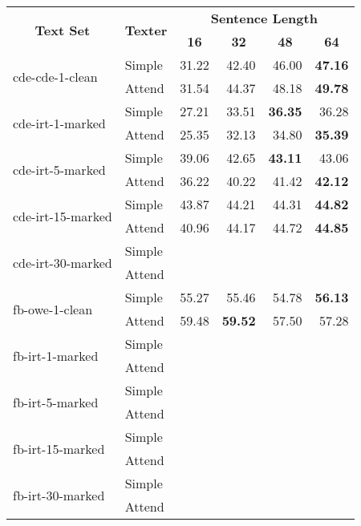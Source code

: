 \begin{tabular}{| l | l | r | r | r | r |}
    \hline

    \multicolumn{1}{|c|}{\multirow{2}{*}{\textbf{Text Set}}} &
    \multicolumn{1}{|c|}{\multirow{2}{*}{\textbf{Texter}}} &
    \multicolumn{4}{|c|}{\textbf{Sentence Length}} \\

    &
    &
    \multicolumn{1}{|c|}{\textbf{16}} &
    \multicolumn{1}{|c|}{\textbf{32}} &
    \multicolumn{1}{|c|}{\textbf{48}} &
    \multicolumn{1}{|c|}{\textbf{64}} \\

    \hline \hline

    \multirow{2}{*}{cde-cde-1-clean}
    & Simple & 31.22 & 42.40 & 46.00 & \textbf{47.16} \\
    & Attend & 31.54 & 44.37 & 48.18 & \textbf{49.78} \\ \hline

    \multirow{2}{*}{cde-irt-1-marked}
    & Simple & 27.21 & 33.51 & \textbf{36.35} & 36.28 \\
    & Attend & 25.35 & 32.13 & 34.80 & \textbf{35.39} \\ \hline

    \multirow{2}{*}{cde-irt-5-marked}
    & Simple & 39.06 & 42.65 & \textbf{43.11} & 43.06 \\
    & Attend & 36.22 & 40.22 & 41.42 & \textbf{42.12} \\ \hline

    \multirow{2}{*}{cde-irt-15-marked}
    & Simple & 43.87 & 44.21 & 44.31 & \textbf{44.82} \\
    & Attend & 40.96 & 44.17 & 44.72 & \textbf{44.85} \\ \hline

    \multirow{2}{*}{cde-irt-30-marked}
    & Simple &  &  &  &  \\
    & Attend &  &  &  &  \\ \hline \hline

    \multirow{2}{*}{fb-owe-1-clean}
    & Simple & 55.27 & 55.46 & 54.78 & \textbf{56.13} \\
    & Attend & 59.48 & \textbf{59.52} & 57.50 & 57.28 \\ \hline

    \multirow{2}{*}{fb-irt-1-marked}
    & Simple &  &  &  &  \\
    & Attend &  &  &  &  \\ \hline

    \multirow{2}{*}{fb-irt-5-marked}
    & Simple &  &  &  &  \\
    & Attend &  &  &  &  \\ \hline

    \multirow{2}{*}{fb-irt-15-marked}
    & Simple &  &  &  &  \\
    & Attend &  &  &  &  \\ \hline

    \multirow{2}{*}{fb-irt-30-marked}
    & Simple &  &  &  &  \\
    & Attend &  &  &  &  \\ \hline

\end{tabular}
